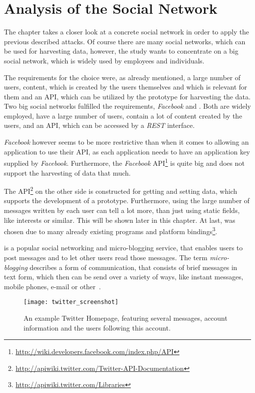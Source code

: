 \chapter{Analysis of the Social Network \Twitter}
\label{chap:analysis}

The chapter takes a closer look at a concrete social network in order to
apply the previous described attacks. Of course there are many social
networks, which can be used for harvesting data, however, the study wants to
concentrate on a big social network, which is widely used by employees and
individuals.

The requirements for the choice were, as already mentioned, a large number of
users, content, which is created by the users themselves and which is
relevant for them and an API, which can be utilized by the prototype for harvesting the data.
Two big social networks fulfilled the requirements, \textit{Facebook} and \Twitter. Both are
widely employed, have a large number of users, contain a lot of content created by the
users, and an API, which can be accessed by a \textit{REST} interface.

\textit{Facebook} however seems to be more restrictive than \Twitter{} when it
comes to allowing an application to use their API, as each application needs to
have an application key supplied by \textit{Facebook}. Furthermore, the
\textit{Facebook}
API\footnote{\url{http://wiki.developers.facebook.com/index.php/API}} is quite
big and does not support the harvesting of data that much.

The \Twitter{}
API\footnote{\url{http://apiwiki.twitter.com/Twitter-API-Documentation}} on the
other side is constructed for getting and setting data, which supports the
development of a prototype. Furthermore, using the large number of messages
written by each \Twitter{} user can tell a lot more, than just using static
fields, like interests or similar. This will be shown later in this chapter.
At last, \Twitter{} was chosen due to many already existing programs and
platform bindings\footnote{\url{http://apiwiki.twitter.com/Libraries}}.

\Twitter{} is a popular social networking and micro-blogging service, that
enables users to post messages and to let other users read those messages.
The term \textit{micro-blogging} describes a form of communication, that
consists of brief messages in text form, which then can be send over a variety
of ways, like instant messages, mobile phones, e-mail or other~\cite{java2007}.

\begin{figure}[hbt]
  \centering
  \texttt{[image: twitter\_screenshot]}
  \caption{An example Twitter Homepage, featuring several \Twitter{}
  messages, account information and the users following this account.}
  \label{fig:twitter_screenshot}
\end{figure}

